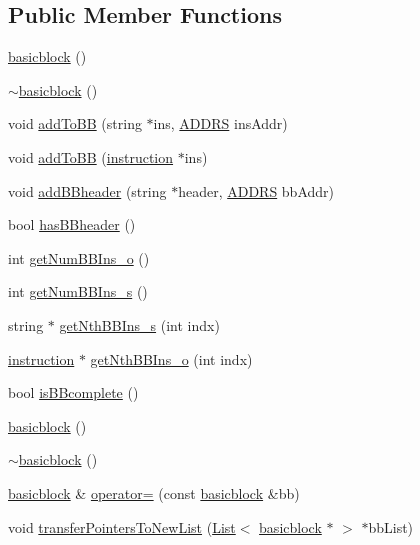 \subsection*{Public Member Functions}
\begin{DoxyCompactItemize}
\item 
\hyperlink{classbasicblock_ac6d735b981c1d367ad93f62ab0394974}{basicblock} ()
\item 
\hyperlink{classbasicblock_a9825a2fafc3b7203bdfe2b0da687bf7d}{$\sim$basicblock} ()
\item 
void \hyperlink{classbasicblock_ad7aa6001155731e9af6347220d48d702}{addToBB} (string $\ast$ins, \hyperlink{global_2global_8h_a7ea74bb9ffd2e4d41550ae2383dd25bc}{ADDRS} insAddr)
\item 
void \hyperlink{classbasicblock_ad741200a033f41ca0e08dadbbbc82060}{addToBB} (\hyperlink{classinstruction}{instruction} $\ast$ins)
\item 
void \hyperlink{classbasicblock_ac2bbc450fee2f47da180fe67b515ace3}{addBBheader} (string $\ast$header, \hyperlink{global_2global_8h_a7ea74bb9ffd2e4d41550ae2383dd25bc}{ADDRS} bbAddr)
\item 
bool \hyperlink{classbasicblock_a2acbd3c9e5af1bcfc60ed44827126d90}{hasBBheader} ()
\item 
int \hyperlink{classbasicblock_a435d01a9a4869893c0a8eaaf4f62cd22}{getNumBBIns\_\-o} ()
\item 
int \hyperlink{classbasicblock_a40ff2e382e333d5515bd55508b49247a}{getNumBBIns\_\-s} ()
\item 
string $\ast$ \hyperlink{classbasicblock_ac215ec20abf70ad5a3a6e4c086a529de}{getNthBBIns\_\-s} (int indx)
\item 
\hyperlink{classinstruction}{instruction} $\ast$ \hyperlink{classbasicblock_ae37c61e43378f8cf5e5b116217c295b1}{getNthBBIns\_\-o} (int indx)
\item 
bool \hyperlink{classbasicblock_aa3e4afae3ad78659454d5747931ee455}{isBBcomplete} ()
\item 
\hyperlink{classbasicblock_ac6d735b981c1d367ad93f62ab0394974}{basicblock} ()
\item 
\hyperlink{classbasicblock_a9825a2fafc3b7203bdfe2b0da687bf7d}{$\sim$basicblock} ()
\item 
\hyperlink{classbasicblock}{basicblock} \& \hyperlink{classbasicblock_a7fee16556188be2c9501c1062589e7a6}{operator=} (const \hyperlink{classbasicblock}{basicblock} \&bb)
\item 
void \hyperlink{classbasicblock_a8f58f53b0f1ab88f2909116193cfa953}{transferPointersToNewList} (\hyperlink{classList}{List}$<$ \hyperlink{classbasicblock}{basicblock} $\ast$ $>$ $\ast$bbList)

\end{DoxyCompactItemize}
